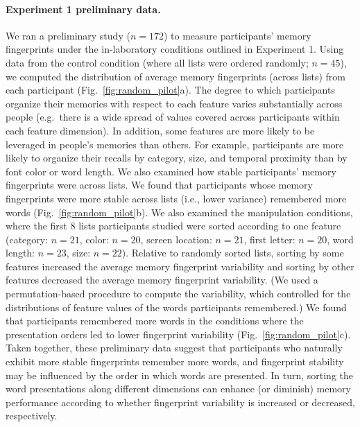 \paragraph{Experiment 1 preliminary data.}
We ran a preliminary study ($n = 172$) to measure participants' memory fingerprints under the in-laboratory conditions outlined in Experiment 1.  Using data from the control condition (where all lists were ordered randomly; $n = 45$), we computed the distribution of average memory fingerprints (across lists) from each participant (Fig.~\ref{fig:random_pilot}a).  The degree to which participants organize their memories with respect to each feature varies substantially across people (e.g.\ there is a wide spread of values covered across participants within each feature dimension).  In addition, some features are more likely to be leveraged in people's memories than others.  For example, participants are more likely to organize their recalls by category, size, and temporal proximity than by font color or word length.  We also examined how stable participants' memory fingerprints were across lists.  We found that participants whose memory fingerprints were more stable across lists (i.e., lower variance) remembered more words (Fig.~\ref{fig:random_pilot}b).  We also examined the manipulation conditions, where the first 8 lists participants studied were sorted according to one feature (category: $n=21$, color: $n=20$, screen location: $n=21$, first letter: $n=20$, word length: $n=23$, size: $n=22$).  Relative to randomly sorted lists, sorting by some features increased the average memory fingerprint variability and sorting by other features decreased the average memory fingerprint variability.  (We used a permutation-based procedure to compute the variability, which controlled for the distributions of feature values of the words participants remembered.)  We found that participants remembered more words in the conditions where the presentation orders led to lower fingerprint variability (Fig.~\ref{fig:random_pilot}c).  Taken together, these preliminary data suggest that participants who naturally exhibit more stable fingerprints remember more words, and fingerprint stability may be influenced by the order in which words are presented.  In turn, sorting the word presentations along different dimensions can enhance (or diminish) memory performance according to whether fingerprint variability is increased or decreased, respectively.

